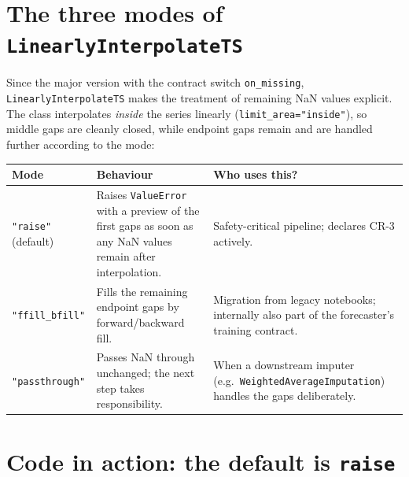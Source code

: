 \documentclass[
  english,
  letterpaper,
]{scrbook}
\newcounter{none} %
\begin{document}
\section{\texorpdfstring{The three modes of
\texttt{LinearlyInterpolateTS}}{The three modes of LinearlyInterpolateTS}}\label{the-three-modes-of-linearlyinterpolatets}

Since the major version with the contract switch \texttt{on\_missing},
\texttt{LinearlyInterpolateTS} makes the treatment of remaining NaN
values explicit. The class interpolates \emph{inside} the series
linearly (\texttt{limit\_area="inside"}), so middle gaps are cleanly
closed, while endpoint gaps remain and are handled further according to
the mode:

{\def\LTcaptype{none} %
\begin{longtable}[]{@{}
  >{\raggedright\arraybackslash}p{}
  >{\raggedright\arraybackslash}p{}
  >{\raggedright\arraybackslash}p{}@{}}
\toprule\noalign{}
\begin{minipage}[b]{\linewidth}\raggedright
Mode
\end{minipage} & \begin{minipage}[b]{\linewidth}\raggedright
Behaviour
\end{minipage} & \begin{minipage}[b]{\linewidth}\raggedright
Who uses this?
\end{minipage} \\
\midrule\noalign{}
\endhead
\bottomrule\noalign{}
\endlastfoot
\texttt{"raise"} (default) & Raises \texttt{ValueError} with a preview
of the first gaps as soon as any NaN values remain after interpolation.
& Safety-critical pipeline; declares CR-3 actively. \\
\texttt{"ffill\_bfill"} & Fills the remaining endpoint gaps by
forward/backward fill. & Migration from legacy notebooks; internally
also part of the forecaster's training contract. \\
\texttt{"passthrough"} & Passes NaN through unchanged; the next step
takes responsibility. & When a downstream imputer
(e.g.~\texttt{WeightedAverageImputation}) handles the gaps
deliberately. \\
\end{longtable}
}

\section{\texorpdfstring{Code in action: the default is
\texttt{raise}}{Code in action: the default is raise}}\label{code-in-action-the-default-is-raise}
\end{document}
